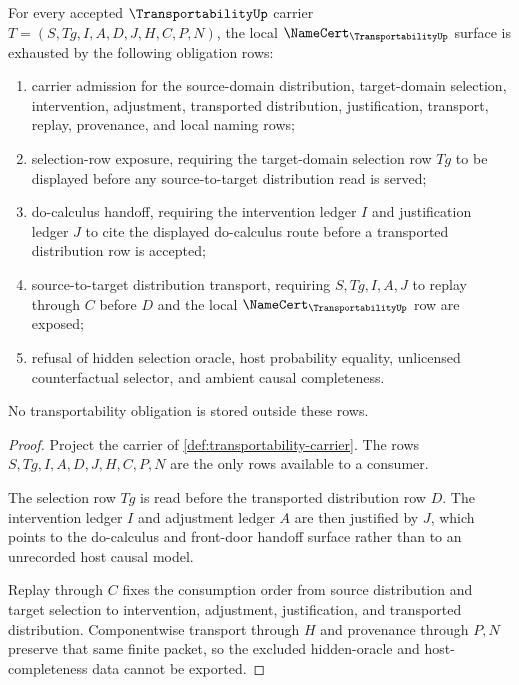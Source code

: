 \begin{theorem}
\label{thm:transportability-namecert-obligations}
For every accepted $\TransportabilityUp$ carrier $T=(S,Tg,I,A,D,J,H,C,P,N)$, the local $\NameCert_{\TransportabilityUp}$ surface is exhausted by the following obligation rows:
\begin{enumerate}
\item carrier admission for the source-domain distribution, target-domain selection, intervention, adjustment, transported distribution, justification, transport, replay, provenance, and local naming rows;
\item selection-row exposure, requiring the target-domain selection row $Tg$ to be displayed before any source-to-target distribution read is served;
\item do-calculus handoff, requiring the intervention ledger $I$ and justification ledger $J$ to cite the displayed do-calculus route before a transported distribution row is accepted;
\item source-to-target distribution transport, requiring $S,Tg,I,A,J$ to replay through $C$ before $D$ and the local $\NameCert_{\TransportabilityUp}$ row are exposed;
\item refusal of hidden selection oracle, host probability equality, unlicensed counterfactual selector, and ambient causal completeness.
\end{enumerate}
No transportability obligation is stored outside these rows.
\end{theorem}
\begin{proof}
Project the carrier of \autoref{def:transportability-carrier}. The rows $S,Tg,I,A,D,J,H,C,P,N$ are the only rows available to a consumer.

The selection row $Tg$ is read before the transported distribution row $D$. The intervention ledger $I$ and adjustment ledger $A$ are then justified by $J$, which points to the do-calculus and front-door handoff surface rather than to an unrecorded host causal model.

Replay through $C$ fixes the consumption order from source distribution and target selection to intervention, adjustment, justification, and transported distribution. Componentwise transport through $H$ and provenance through $P,N$ preserve that same finite packet, so the excluded hidden-oracle and host-completeness data cannot be exported.
\end{proof}

